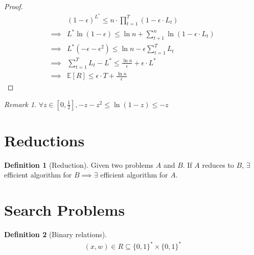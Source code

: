 \documentclass[11pt]{article}
\theoremstyle{definition}
\newtheorem{definition}{Definition}[section]
\theoremstyle{remark}
\newtheorem*{remark}{Remark}
\begin{document}
\begin{proof}
\begin{align*}
& (1-\epsilon)^{L^*} \leq n \cdot \prod_{t=1}^{T} (1 - \epsilon \cdot L_t) \\ 
\implies & L^* \ln (1-\epsilon) \leq \ln n + \sum _{t+1}^n \ln (1 - \epsilon \cdot L_t) \\
\implies & L^* (-\epsilon-\epsilon^2) \leq \ln n - \epsilon \sum_{t=1}^T L_t \\
\implies & \sum_{t=1}^T L_t - L^* \leq \frac{\ln n}{\epsilon} + \epsilon \cdot L^* \\
\implies & \mathbb{E}[R] \leq \epsilon \cdot T + \frac{\ln n}{\epsilon}
\end{align*}
\end{proof}

\begin{remark} $\forall z \in [0,\frac{1}{2}], -z-z^2 \leq \ln (1-z) \leq -z$
\end{remark}
\clearpage

\section{Reductions}
\begin{definition}[Reduction]
Given two problems $A$ and $B$. If $A$ reduces to $B$, $\exists$ efficient algorithm for $B \implies \exists$ efficient algorithm for $A$.
\end{definition}

\clearpage

\section{Search Problems}
\begin{definition}[Binary relations]
\begin{align*}
(x,w) \in R \subseteq \{ 0,1 \}^* \times \{ 0,1 \}^*
\end{align*}
\end{definition}
\end{document}
